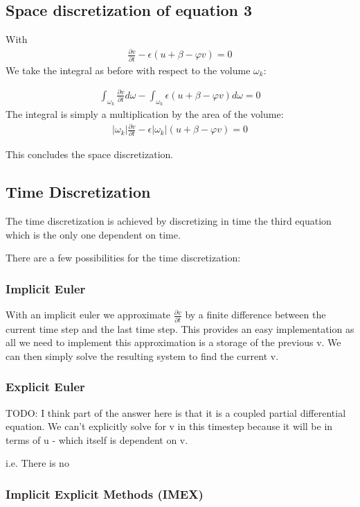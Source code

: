 \documentclass{finalproject}
\begin{document}
\subsection{Space discretization of equation 3}
With 
\begin{align*}
\frac{\partial v}{\partial t} - \epsilon(u + \beta - \varphi v) = 0
\end{align*}
We take the integral as before with respect to the volume $\omega_k$:

\begin{align*}
\int_{\omega_k}\frac{\partial v}{\partial t} d\omega - \int_{\omega_k} \epsilon(u + \beta - \varphi v)d\omega = 0
\end{align*}
The integral is simply a multiplication by the area of the volume:
\begin{align*}
|\omega_k|\frac{\partial v}{\partial t} - \epsilon |\omega_k| (u + \beta - \varphi v) = 0
\end{align*}

This concludes the space discretization.
\subsection{Time Discretization}
The time discretization is achieved by discretizing in time the third equation which is the only one dependent on time. 

There are a few possibilities for the time discretization:

\subsubsection{Implicit Euler}
With an implicit euler we approximate $\frac{\partial v}{\partial t}$ by a finite difference between the current time step and the last time step. This provides an easy implementation as all we need to implement this approximation is a storage of the previous v. We can then simply solve the resulting system to find the current v.
\subsubsection{Explicit Euler}
TODO: I think part of the answer here is that it is a coupled partial differential equation. We can't explicitly solve for v in this timestep because it will be in terms of u - which itself is dependent on v. 

i.e. There is no 
\subsubsection{Implicit Explicit Methods (IMEX)}
\end{document}
